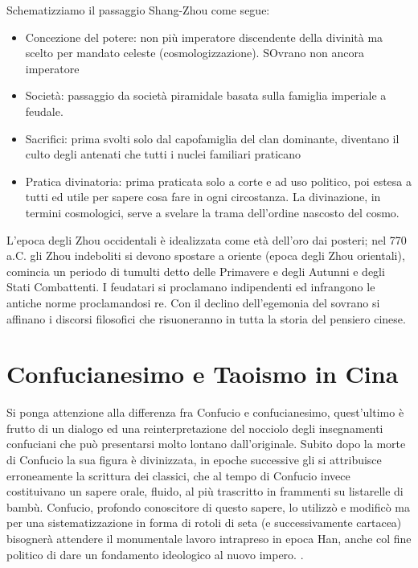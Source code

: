 \documentclass[10pt,a4paper]{report}
\begin{document}
Schematizziamo il passaggio Shang-Zhou come segue:
\begin{itemize}
	\item Concezione del potere: non più imperatore discendente della divinità ma scelto per mandato celeste (cosmologizzazione). SOvrano non ancora imperatore
	\item Società: passaggio da società piramidale basata sulla famiglia imperiale a feudale.
	\item Sacrifici: prima svolti solo dal capofamiglia del clan dominante, diventano il culto degli antenati che tutti i nuclei familiari praticano
	\item Pratica divinatoria: prima praticata solo a corte e ad uso politico, poi estesa a tutti ed utile per sapere cosa fare in ogni circostanza. La divinazione, in termini cosmologici, serve a svelare la trama dell'ordine nascosto del cosmo. 
\end{itemize}
L'epoca degli Zhou occidentali è idealizzata come età dell'oro dai posteri; nel 770 a.C. gli Zhou indeboliti si devono spostare a oriente (epoca degli Zhou orientali), comincia un periodo di tumulti detto delle Primavere e degli Autunni e degli Stati Combattenti. I feudatari si proclamano indipendenti ed infrangono le antiche norme proclamandosi re. Con il declino dell'egemonia del sovrano si affinano i discorsi filosofici che risuoneranno in tutta la storia del pensiero cinese. 
\chapter{Confucianesimo e Taoismo in Cina}
Si ponga attenzione alla differenza fra Confucio e confucianesimo, quest'ultimo è frutto di un dialogo ed una reinterpretazione del nocciolo degli insegnamenti confuciani che può presentarsi molto lontano dall'originale. Subito dopo la morte di Confucio la sua figura è divinizzata, in epoche successive gli si attribuisce erroneamente la scrittura dei classici, che al tempo di Confucio invece costituivano un sapere orale, fluido, al più trascritto in frammenti su listarelle di bambù. Confucio, profondo conoscitore di questo sapere, lo utilizzò e modificò ma per una sistematizzazione in forma di rotoli di seta (e successivamente cartacea) bisognerà attendere il monumentale lavoro intrapreso in epoca Han, anche col fine politico di dare un fondamento ideologico al nuovo impero. .
\end{document}

